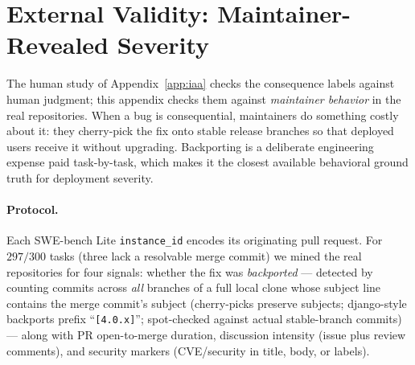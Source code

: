 \documentclass{article}
\begin{document}
\section{External Validity: Maintainer-Revealed Severity}
\label{app:realcost}

The human study of Appendix~\ref{app:iaa} checks the consequence
labels against human judgment; this appendix checks them against
\emph{maintainer behavior} in the real repositories. When a bug is
consequential, maintainers do something costly about it: they
cherry-pick the fix onto stable release branches so that deployed
users receive it without upgrading. Backporting is a deliberate
engineering expense paid task-by-task, which makes it the closest
available behavioral ground truth for deployment severity.

\paragraph{Protocol.} Each SWE-bench Lite \texttt{instance\_id}
encodes its originating pull request. For $297/300$ tasks (three lack
a resolvable merge commit) we mined the real repositories for four
signals: whether the fix was \emph{backported} --- detected by
counting commits across \emph{all} branches of a full local clone
whose subject line contains the merge commit's subject (cherry-picks
preserve subjects; django-style backports prefix ``\texttt{[4.0.x]}'';
spot-checked against actual stable-branch commits) --- along with PR
open-to-merge duration, discussion intensity (issue plus review
comments), and security markers (CVE/security in title, body, or
labels).
\end{document}
